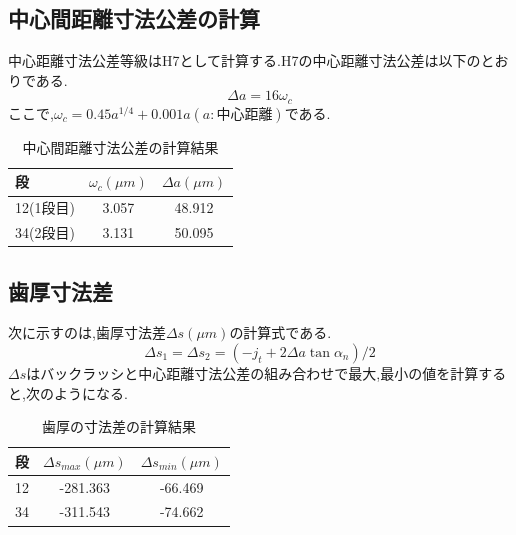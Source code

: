 \subsection{中心間距離寸法公差の計算}
中心距離寸法公差等級はH7として計算する.H7の中心距離寸法公差は以下のとおりである.
\begin{equation}
\Delta a=16 \omega_c
\end{equation}
ここで,$\omega_c = 0.45a^{1/4}+0.001a (a:中心距離)$である.
\begin{table}[htb]
\begin{center}
  \caption{中心間距離寸法公差の計算結果}
  \begin{tabular}{|l||c|c|} \hline
段 &$\omega_c(\mu m)$&$\Delta a(\mu m)$\\\hline
12(1段目)&3.057&48.912\\
34(2段目)&3.131&50.095\\
\hline
  \end{tabular}
\end{center}
\end{table}

\subsection{歯厚寸法差}
次に示すのは,歯厚寸法差$\Delta s(\mu m)$の計算式である.
\begin{equation}
\Delta s_1 = \Delta s_2 =(-j_t + 2\Delta a \tan \alpha_n)/2 \nonumber
\end{equation}
$\Delta s$はバックラッシと中心距離寸法公差の組み合わせで最大,最小の値を計算すると,次のようになる.
\begin{table}[htb]
\begin{center}
  \caption{歯厚の寸法差の計算結果}
  \begin{tabular}{|l||c|c|} \hline
段    &$\Delta s_{max}(\mu m)$	&$\Delta s_{min}(\mu m)$\\\hline
12    &-281.363	&-66.469\\
34    &-311.543	&-74.662\\\hline
  \end{tabular}
\end{center}
\end{table}

